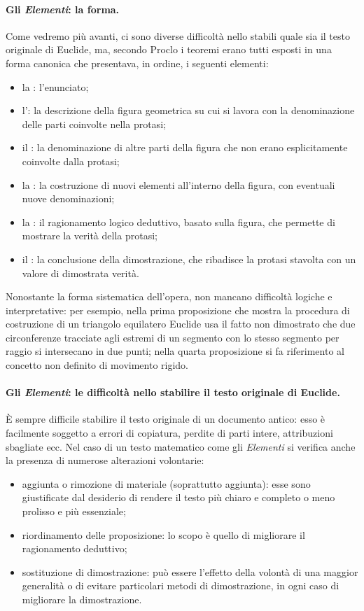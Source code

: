 \paragraph{Gli \textit{Elementi}: la forma.}
\par Come vedremo pi\`u avanti, ci sono diverse difficolt\`a nello stabili quale sia il testo originale di Euclide, ma, secondo Proclo i teoremi erano tutti esposti in una forma canonica che presentava, in ordine, i seguenti elementi:
\begin{itemize}
	\item la : l'enunciato;
	\item l': la descrizione della figura geometrica su cui si lavora con la denominazione delle parti coinvolte nella protasi;
	\item il : la denominazione di altre parti della figura che non erano esplicitamente coinvolte dalla protasi;
	\item la : la costruzione di nuovi elementi all'interno della figura, con eventuali nuove denominazioni;
	\item la : il ragionamento logico deduttivo, basato sulla figura, che permette di mostrare la verit\`a della protasi;
	\item il : la conclusione della dimostrazione, che ribadisce la protasi stavolta con un valore di dimostrata verit\`a.
\end{itemize}
\par Nonostante la forma sistematica dell'opera, non mancano difficolt\`a logiche e interpretative: per esempio, nella prima proposizione che mostra la procedura di costruzione di un triangolo equilatero Euclide usa il fatto non dimostrato che due circonferenze tracciate agli estremi di un segmento con lo stesso segmento per raggio si intersecano in due punti; nella quarta proposizione si fa riferimento al concetto non definito di movimento rigido.
\paragraph{Gli \textit{Elementi}: le difficolt\`a nello stabilire il testo originale di Euclide.} \`E sempre difficile stabilire il testo originale di un documento antico: esso \`e facilmente soggetto a errori di copiatura, perdite di parti intere, attribuzioni sbagliate ecc. Nel caso di un testo matematico come gli \textit{Elementi} si verifica anche la presenza di numerose alterazioni volontarie:
\begin{itemize}
	\item aggiunta o rimozione di materiale (soprattutto aggiunta): esse sono giustificate dal desiderio di rendere il testo pi\`u chiaro e completo o meno prolisso e pi\`u essenziale;
	\item riordinamento delle proposizione: lo scopo \`e quello di migliorare il ragionamento deduttivo;
	\item sostituzione di dimostrazione: pu\`o essere l'effetto della volont\`a di una maggior generalit\`a o di evitare particolari metodi di dimostrazione, in ogni caso di migliorare la dimostrazione.
\end{itemize}
